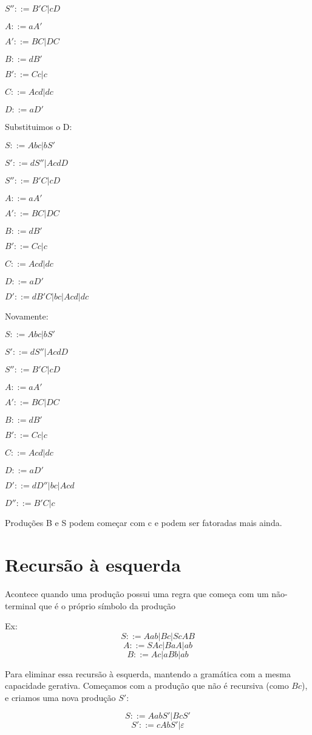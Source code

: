 \documentclass[]{article}
\begin{document}
	$S''::= B'C | cD$
	
	$A ::= aA'$
	
	$A'::= BC |DC$
	
	$B::= dB'$
	
	$B'::=Cc|c$
	
	$C::= Acd |dc$
	
	$D::= aD'$
	
	Substituimos o D:
	
	$S::= Abc | bS'$

	$S'::=dS'' | AcdD$	
	
	$S''::= B'C | cD$
	
	$A ::= aA'$
	
	$A'::= BC |DC$
	
	$B::= dB'$
	
	$B'::=Cc|c$
	
	$C::= Acd |dc$
	
	$D::= aD'$
	
	$D'::= dB'C | bc | Acd | dc$
	
	Novamente:
	
	$S::= Abc | bS'$

	$S'::=dS'' | AcdD$	
	
	$S''::= B'C | cD$
	
	$A ::= aA'$
	
	$A'::= BC |DC$
	
	$B::= dB'$
	
	$B'::=Cc|c$
	
	$C::= Acd |dc$
	
	$D::= aD'$
	
	$D'::= dD'' | bc | Acd$
	
	$D''::= B'C | c$
	
	Produções B e S podem começar com c e podem ser fatoradas mais ainda.
	
\section{Recursão à esquerda}

	Acontece quando uma produção possui uma regra que começa com um não-terminal que é o próprio símbolo da produção

	Ex:
	$$S::= Aab|Bc| ScAB$$	
	$$A::= SAc | BaA |ab$$
	$$B::= Ac |aBb |ab$$
	
	Para eliminar essa recursão à esquerda, mantendo a gramática com a mesma capacidade gerativa. Começamos com a produção que não é recursiva (como $Bc$), e criamos uma nova produção $S'$:
	
	$$S::= AabS' | BcS'$$
	$$S'::= cAbS' | \varepsilon$$
	
\end{document}
